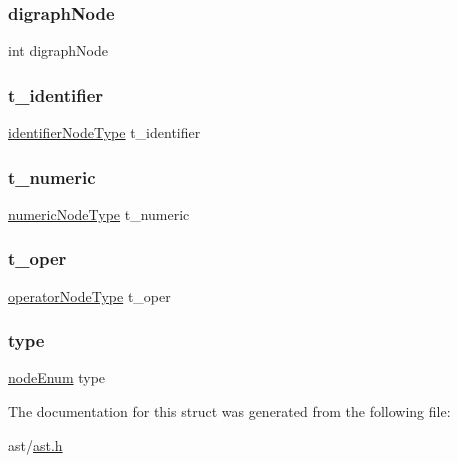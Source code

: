 \subsubsection{\texorpdfstring{digraph\+Node}{digraphNode}}
{\footnotesize\ttfamily int digraph\+Node}

\mbox{\label{structnode_type_tag_a02bb0284bffb88e6a4cee581a891e540}} 
\subsubsection{\texorpdfstring{t\+\_\+identifier}{t\_identifier}}
{\footnotesize\ttfamily \hyperlink{structidentifier_node_type}{identifier\+Node\+Type} t\+\_\+identifier}

\mbox{\label{structnode_type_tag_afc977737cf4a23085551f9fa013a4691}} 
\subsubsection{\texorpdfstring{t\+\_\+numeric}{t\_numeric}}
{\footnotesize\ttfamily \hyperlink{structnumeric_node_type}{numeric\+Node\+Type} t\+\_\+numeric}

\mbox{\label{structnode_type_tag_ac7bb317a3d1980651b962f891f162462}} 
\subsubsection{\texorpdfstring{t\+\_\+oper}{t\_oper}}
{\footnotesize\ttfamily \hyperlink{structoperator_node_type}{operator\+Node\+Type} t\+\_\+oper}

\mbox{\label{structnode_type_tag_ab60be6a5113c8fd8928ef6bf82580818}} 
\subsubsection{\texorpdfstring{type}{type}}
{\footnotesize\ttfamily \hyperlink{ast_8h_a14ca0b0420e32b2a603589b79d680a9e}{node\+Enum} type}



The documentation for this struct was generated from the following file\+:\begin{DoxyCompactItemize}
\item 
ast/\hyperlink{ast_8h}{ast.\+h}\end{DoxyCompactItemize}
